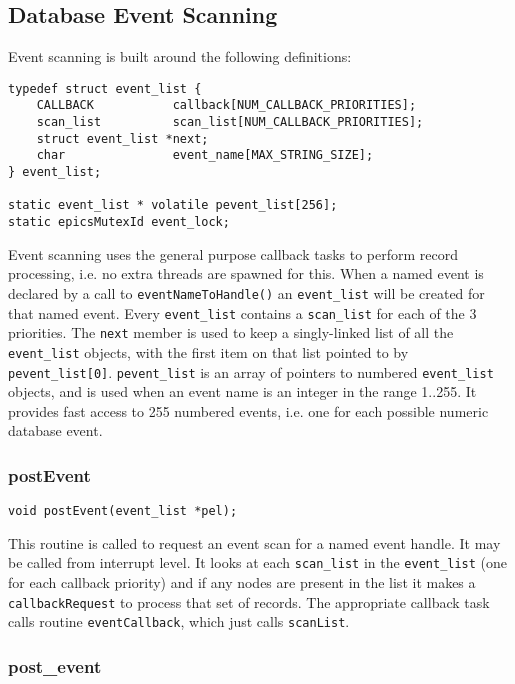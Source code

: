 \subsection{Database Event Scanning}

Event scanning is built around the following definitions:

\begin{verbatim}
typedef struct event_list {
    CALLBACK           callback[NUM_CALLBACK_PRIORITIES];
    scan_list          scan_list[NUM_CALLBACK_PRIORITIES];
    struct event_list *next;
    char               event_name[MAX_STRING_SIZE];
} event_list;

static event_list * volatile pevent_list[256];
static epicsMutexId event_lock;
\end{verbatim}

Event scanning uses the general purpose callback tasks to perform record processing, i.e. no extra threads are spawned for this.
When a named event is declared by a call to \verb|eventNameToHandle()| an \verb|event_list| will be created for that named event.
Every \verb|event_list| contains a \verb|scan_list| for each of the 3 priorities.
The \verb|next| member is used to keep a singly-linked list of all the \verb|event_list| objects, with the first item on that list pointed to by \verb|pevent_list[0]|.
\verb|pevent_list| is an array of pointers to numbered \verb|event_list| objects, and is used when an event name is an integer in the range 1..255.
It provides fast access to 255 numbered events, i.e. one for each possible numeric database event.

\subsubsection{postEvent}

\begin{verbatim}
void postEvent(event_list *pel);
\end{verbatim}

This routine is called to request an event scan for a named event handle.
It may be called from interrupt level.
It looks at each \verb|scan_list| in the \verb|event_list| (one for each callback priority) and if any nodes are present in the list it makes a \verb|callbackRequest| to process that set of records.
The appropriate callback task calls routine \verb|eventCallback|, which just calls \verb|scanList|.

\subsubsection{post\_event}

